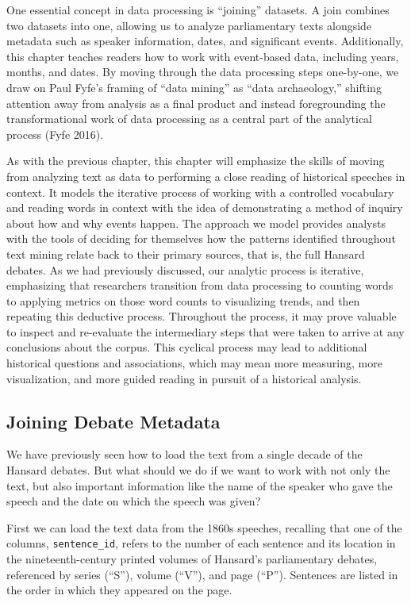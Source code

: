 \documentclass[
]{article}
\newcounter{chapter}
\begin{document}
One essential concept in data processing is ``joining'' datasets. A join
combines two datasets into one, allowing us to analyze parliamentary
texts alongside metadata such as speaker information, dates, and
significant events. Additionally, this chapter teaches readers how to
work with event-based data, including years, months, and dates. By
moving through the data processing steps one-by-one, we draw on Paul
Fyfe's framing of ``data mining'' as ``data archaeology,'' shifting
attention away from analysis as a final product and instead
foregrounding the transformational work of data processing as a central
part of the analytical process (Fyfe 2016).

As with the previous chapter, this chapter will emphasize the skills of
moving from analyzing text as data to performing a close reading of
historical speeches in context. It models the iterative process of
working with a controlled vocabulary and reading words in context with
the idea of demonstrating a method of inquiry about how and why events
happen. The approach we model provides analysts with the tools of
deciding for themselves how the patterns identified throughout text
mining relate back to their primary sources, that is, the full Hansard
debates. As we had previously discussed, our analytic process is
iterative, emphasizing that researchers transition from data processing
to counting words to applying metrics on those word counts to
visualizing trends, and then repeating this deductive process.
Throughout the process, it may prove valuable to inspect and re-evaluate
the intermediary steps that were taken to arrive at any conclusions
about the corpus. This cyclical process may lead to additional
historical questions and associations, which may mean more measuring,
more visualization, and more guided reading in pursuit of a historical
analysis.

\subsection{Joining Debate Metadata}\label{joining-debate-metadata}

We have previously seen how to load the text from a single decade of the
Hansard debates. But what should we do if we want to work with not only
the text, but also important information like the name of the speaker
who gave the speech and the date on which the speech was given?

First we can load the text data from the 1860s speeches, recalling that
one of the columns, \texttt{sentence\_id}, refers to the number of each
sentence and its location in the nineteenth-century printed volumes of
Hansard's parliamentary debates, referenced by series (``S''), volume
(``V''), and page (``P''). Sentences are listed in the order in which
they appeared on the page.
\end{document}
